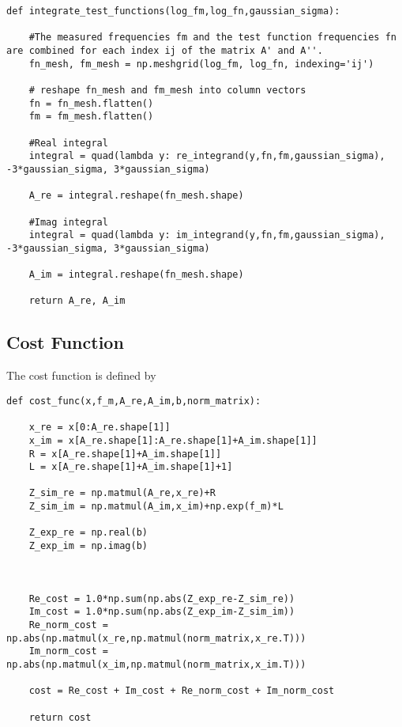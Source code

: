 \documentclass[11pt]{article}
\begin{document}
\begin{verbatim}
def integrate_test_functions(log_fm,log_fn,gaussian_sigma):

    #The measured frequencies fm and the test function frequencies fn are combined for each index ij of the matrix A' and A''.
    fn_mesh, fm_mesh = np.meshgrid(log_fm, log_fn, indexing='ij')

    # reshape fn_mesh and fm_mesh into column vectors
    fn = fn_mesh.flatten()
    fm = fm_mesh.flatten()

    #Real integral
    integral = quad(lambda y: re_integrand(y,fn,fm,gaussian_sigma), -3*gaussian_sigma, 3*gaussian_sigma)

    A_re = integral.reshape(fn_mesh.shape)

    #Imag integral    
    integral = quad(lambda y: im_integrand(y,fn,fm,gaussian_sigma), -3*gaussian_sigma, 3*gaussian_sigma)

    A_im = integral.reshape(fn_mesh.shape)

    return A_re, A_im

\end{verbatim}

\subsection{Cost Function}
\label{sec:org4b6f224}

The cost function is defined by

\begin{verbatim}
def cost_func(x,f_m,A_re,A_im,b,norm_matrix):

    x_re = x[0:A_re.shape[1]]
    x_im = x[A_re.shape[1]:A_re.shape[1]+A_im.shape[1]]
    R = x[A_re.shape[1]+A_im.shape[1]]
    L = x[A_re.shape[1]+A_im.shape[1]+1]

    Z_sim_re = np.matmul(A_re,x_re)+R
    Z_sim_im = np.matmul(A_im,x_im)+np.exp(f_m)*L

    Z_exp_re = np.real(b)
    Z_exp_im = np.imag(b)



    Re_cost = 1.0*np.sum(np.abs(Z_exp_re-Z_sim_re))
    Im_cost = 1.0*np.sum(np.abs(Z_exp_im-Z_sim_im))
    Re_norm_cost = np.abs(np.matmul(x_re,np.matmul(norm_matrix,x_re.T)))
    Im_norm_cost = np.abs(np.matmul(x_im,np.matmul(norm_matrix,x_im.T)))

    cost = Re_cost + Im_cost + Re_norm_cost + Im_norm_cost

    return cost

\end{verbatim}
\end{document}
